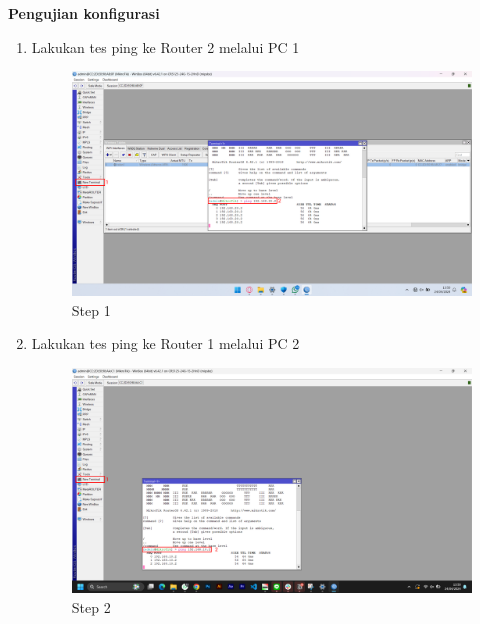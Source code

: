 \begin{center}
	\textbf{Pengujian konfigurasi}
	\begin{enumerate}
		\item Lakukan tes ping ke Router 2 melalui PC 1
		\begin{figure}[H]
			\centering
			\includegraphics[width=0.9\linewidth]{P2/img/per1/pc1/Step 4.png}
			\caption{Step 1}
			\label{fig:Ping Step 1(Per.1 PC1)}
		\end{figure}
		\item Lakukan tes ping ke Router 1 melalui PC 2
		\begin{figure}[H]
			\centering
			\includegraphics[width=0.9\linewidth]{P2/img/per1/pc2/Step 4.png}
			\caption{Step 2}
			\label{fig:Ping Step 2(Per.1 PC2)}
		\end{figure}
	\end{enumerate}
\end{center}

